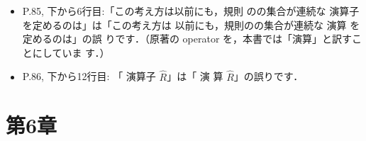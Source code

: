 \documentclass[12pt,titlepage,twoside,openright,dvipdfmx]{jsbook}
\newcommand\old[1]{%
  \textcolor[rgb]{1.0,0.25,0.1}{#1}%
  }
\newcommand\new[1]{%
  \textcolor[rgb]{0,0.55,1.0}{#1}%
  }
\theoremstyle{definition}
\begin{document}
\begin{itemize}
\begin{align*}
      = {} & \bigsqcup_{n\in\omega}f^n(\bot) &&  \text {（$\bot = f^0(\bot)$より）}\\
      = {} & \mathit{fix}(f) &&  \text {（$\mathit{fix}(f)$の定義より）}\\
    \end{align*}
    のように各説明を一行ずつ下げて，各行の$\text{（\dots）}$が，その行
    の${=}$の右辺と，その前の行の${=}$の右辺とが等しい理由を説明する方
    が標準的かもしれません．
  \item P.85, 下から6行目:「この考え方は以前にも，規則
    の\terminstance{}の集合が連続な\old{演算子}を定めるのは」は「この考え方は
    以前にも，規則の\terminstance{}の集合が連続な\new{演算}を定めるのは」の誤
    りです．（原著の operator を，本書では「演算」と訳すことにしていま
    す．）
  \item P.86, 下から12行目: 「\old{演算子}$\widehat{R}$」は「\new{演
    算}$\widehat{R}$」の誤りです．
\end{itemize}

\section*{第6章}
\end{document}
